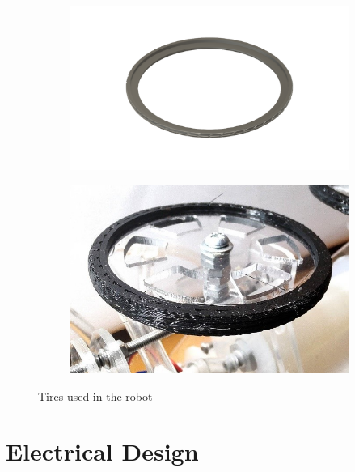 \documentclass[twoside]{article}
\begin{document}
\begin{figure}[H]
	\centering
	\begin{subfigure}[b]{0.5\linewidth}
		\centering
		\includegraphics[width=\textwidth]{half_tire_cad}
	\end{subfigure}%
	\begin{subfigure}[b]{0.5\linewidth}
		\centering		
		\includegraphics[width=\textwidth]{full_tire}
	\end{subfigure}
	\caption{Tires used in the robot}
\end{figure}


\section{Electrical Design}
\end{document}
